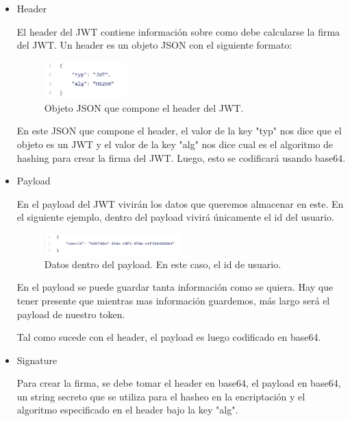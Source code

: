 \begin{itemize}
	\item Header
		
	El header del JWT contiene información sobre como debe calcularse la firma del JWT. 
	Un header es un objeto JSON con el siguiente formato:
	
	\begin{figure}[H] 
		\centering    
		\includegraphics[width=0.3\textwidth]{jwt2}
		\caption[JWT Header]{Objeto JSON que compone el header del JWT.}
		\label{fig:jwt-header}
	\end{figure}
	
	En este JSON que compone el header, el valor de la key "typ" nos dice que el objeto 
	es un JWT y el valor de la key "alg" nos dice cual es el algoritmo de hashing para 
	crear la firma del JWT. Luego, esto se codificará usando base64.
	
	
	\item Payload
	
	En el payload del JWT vivirán los datos que queremos almacenar en este. En el siguiente 
	ejemplo, dentro del payload vivirá únicamente el id del usuario.
	
	\begin{figure}[H] 
		\centering    
		\includegraphics[width=0.5\textwidth]{jwt3}
		\caption[JWT Payload]{Datos dentro del payload. En este caso, el id de usuario.}
		\label{fig:jwt-payload}
	\end{figure}
	
	En el payload se puede guardar tanta información como se quiera. Hay que tener presente 
	que mientras mas información guardemos, más largo será el payload de nuestro token.
	
	Tal como sucede con el header, el payload es luego codificado en base64.
	
	\item Signature
	
	Para crear la firma, se debe tomar el header en base64, el payload en base64, un string 
	secreto que se utiliza para el hasheo en la encriptación y el algoritmo especificado 
	en el header bajo la key "alg". 
	

\end{itemize}
